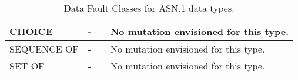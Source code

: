 \begin{table}[h]
\begin{center}
\begin{tabular}{|p{2cm}|p{2cm}|p{4cm}|p{4cm}|}
\\
\hline
CHOICE&
-&
\begin{minipage}{4cm}
\end{minipage}
&
\begin{minipage}{4cm}
No mutation envisioned for this type.
\end{minipage}
\\
\hline
SEQUENCE OF&
-&
\begin{minipage}{4cm}
\end{minipage}
&
\begin{minipage}{4cm}
No mutation envisioned for this type.
\end{minipage}
\\
\hline
SET OF&
-&
\begin{minipage}{4cm}
\end{minipage}
&
\begin{minipage}{4cm}
No mutation envisioned for this type.
\end{minipage}
\\



\hline
\end{tabular}
\end{center}
\caption{Data Fault Classes for ASN.1 data types.}
\label{table:faultModel:FAQAS:ASN1}
\end{table}%